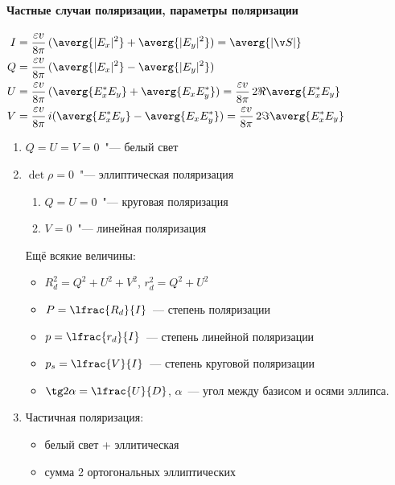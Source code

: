 \documentclass[draft]{trchesh}
\begin{document}
\begin{multicols*}{3}
\paragraph{Частные случаи поляризации, параметры поляризации}
$
\begin{aligned}
  I &= \frac{\varepsilon v}{8 \pi} \, (\averg{|E_x|^2} +  \averg{|E_y|^2}) = \averg{|\v S|} \\
  Q &= \frac{\varepsilon v}{8 \pi} \, (\averg{|E_x|^2} -  \averg{|E_y|^2}) \\
  U &= \frac{\varepsilon v}{8 \pi} \, (\averg{E_x^* E_y} +  \averg{E_xE_y^*}) 
  = \frac{\varepsilon v}{8 \pi} \, 2 \Re \averg{E_x^* E_y} \\
  V &= \frac{\varepsilon v}{8 \pi} \,i (\averg{E_x^* E_y} -  \averg{E_xE_y^*}) 
  = \frac{\varepsilon v}{8 \pi} \, 2 \Im \averg{E_x^* E_y} \\
\end{aligned}
$
\begin{enumerate}
  \item $Q=U=V=0$~"--- белый свет
  \item $\det \rho = 0$~"--- эллиптическая поляризация
\begin{enumerate}
  \item $Q=U=0$~"--- круговая поляризация
  \item $V=0$~"--- линейная поляризация
\end{enumerate}

Ещё всякие величины:
\begin{itemize}
  \item $R_d^2 = Q^2 + U^2 + V^2$, $r_d^2 = Q^2 + U^2$
  \item $P = \lfrac{R_d}{I}$~--- степень поляризации
  \item $p = \lfrac{r_d}{I}$~--- степень линейной поляризации
  \item $p_s = \lfrac{V}{I}$~--- степень круговой поляризации
  \item $\tg 2 \alpha = \lfrac{U}{D}$, $\alpha$~--- угол между базисом и осями эллипса.
\end{itemize}

\item Частичная поляризация:  
\begin{itemize}
  \item белый свет + эллитическая
  \item сумма 2 ортогональных эллиптических
\end{itemize}
\end{enumerate}

\end{multicols*}
\end{document}
